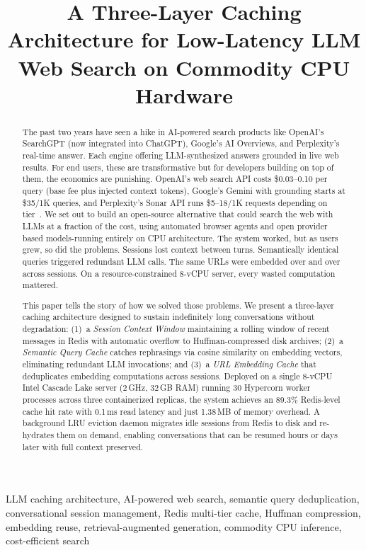 \documentclass[conference]{IEEEtran}
\title{A Three-Layer Caching Architecture for Low-Latency LLM Web Search on Commodity CPU Hardware}
\author{
\IEEEauthorblockN{Ayushman Bhattacharya}
\IEEEauthorblockA{MyceliAI AÜ\\ayushman@myceli.ai}
}
\begin{document}
\maketitle


\begin{abstract}
The past two years have seen a hike in AI-powered search products like OpenAI's SearchGPT (now integrated into ChatGPT), Google's AI Overviews, and Perplexity's real-time answer. Each engine offering LLM-synthesized answers grounded in live web results. For end users, these are transformative but for developers building on top of them, the economics are punishing. OpenAI's web search API costs \$0.03--0.10 per query (base fee plus injected context tokens), Google's Gemini with grounding starts at \$35/1K queries, and Perplexity's Sonar API runs \$5--18/1K requests depending on tier~\cite{perplexity_pricing}. We set out to build an open-source alternative that could search the web with LLMs at a fraction of the cost, using automated browser agents and open provider based models-running entirely on CPU architecture.  The system worked, but as users grew, so did the problems. Sessions lost context between turns. Semantically identical queries triggered redundant LLM calls. The same URLs were embedded over and over across sessions. On a resource-constrained 8-vCPU server, every wasted computation mattered.

This paper tells the story of how we solved those problems. We present a three-layer caching architecture designed to sustain indefinitely long conversations without degradation: (1)~a \emph{Session Context Window} maintaining a rolling window of recent messages in Redis with automatic overflow to Huffman-compressed disk archives; (2)~a \emph{Semantic Query Cache} catches rephrasings via cosine similarity on embedding vectors, eliminating redundant LLM invocations; and (3)~a \emph{URL Embedding Cache} that deduplicates embedding computations across sessions. Deployed on a single 8-vCPU Intel Cascade Lake server (2\,GHz, 32\,GB RAM) running 30 Hypercorn worker processes across three containerized replicas, the system achieves an 89.3\% Redis-level cache hit rate with 0.1\,ms read latency and just 1.38\,MB of memory overhead. A background LRU eviction daemon migrates idle sessions from Redis to disk and re-hydrates them on demand, enabling conversations that can be resumed hours or days later with full context preserved.
\end{abstract}

\begin{IEEEkeywords}
LLM caching architecture, AI-powered web search, semantic query deduplication, conversational session management, Redis multi-tier cache, Huffman compression, embedding reuse, retrieval-augmented generation, commodity CPU inference, cost-efficient search
\end{IEEEkeywords}
\end{document}
